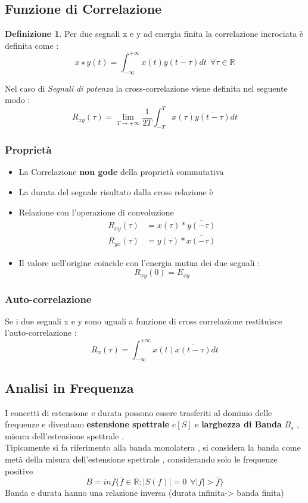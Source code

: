 \documentclass{article}
\theoremstyle{definition}
\newtheorem*{definizione}{Definizione}
\newcommand{\R}{\mathbb{R}}
\newcommand{\intinf}{\int_{-\infty}^{+\infty}}
\begin{document}
\subsection{Funzione di Correlazione}
\begin{definizione}
	Per due segnali x e y ad energia finita la correlazione incrociata è definita come : 
	$$x \star y (t)=\intinf x(t)\overline{y(t-\tau)}dt  \ \ \forall \tau \in \R$$

Nel caso di \textit{Segnali di potenza} la cross-correlazione viene definita nel seguente modo :
$$R_{xy}(\tau)=\lim_{T\rightarrow +\infty}\frac{1}{2T}\int_{-T}^{T}x(\tau)\overline{y(t-\tau)}dt$$
\end{definizione}
\subsubsection{Proprietà}
\begin{itemize}
\item La Correlazione \textbf{non gode} della proprietà commutativa
\item La durata del segnale risultato dalla cross relazione è 
\item Relazione con l'operazione di convoluzione 
\begin{align*}
	R_{xy}(\tau)&= x(\tau) * \overline{y(-\tau)}\\
	R_{yx}(\tau)&=y(\tau) * \overline{x(-\tau)}
\end{align*}
\item Il valore nell'origine coincide con l'energia mutua dei due segnali :
$$R_{xy}(0)=E_{xy}$$
\end{itemize}
\subsubsection{Auto-correlazione}
Se i due segnali x e y sono uguali a funzione di cross correlazione restituisce l'auto-correlazione : 
$$R_x(\tau)=\intinf x(t)\overline{x(t-\tau)}dt$$
\subsection{Analisi in Frequenza}
I concetti di estensione e durata possono essere trasferiti al dominio delle frequenze e diventano \textbf{estensione spettrale } $e[S]$ e \textbf{larghezza di Banda }$B_s$ , misura dell'estensione spettrale .\\ Tipicamente si fa riferimento alla banda monolatera , si considera la banda come metà della misura dell'estensione spettrale , considerando solo le frequenze positive  $$B=inf \{\overline{f}\in \R : |S(f)|=0\ \  \forall |f|> \overline{f}\}$$
Banda e durata hanno una relazione inversa (durata infinita-> banda finita)
\end{document}
